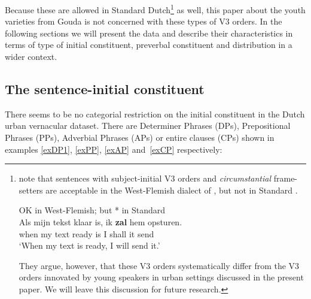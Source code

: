 \documentclass[output=paper]{langsci/langscibook}
\begin{document}
\noindent Because these are allowed in Standard
Dutch\footnote{\citet{GrecoHaegeman2020} note that sentences with
    subject-initial V3 orders and \emph{circumstantial} frame-setters are
    acceptable in the West-Flemish dialect of , but not in Standard .

\begin{exe}                   %
     OK in West-Flemish; but * in Standard \\
    \gll \llap{*}Als mijn tekst klaar is, ik \textbf{zal} hem opsturen.\\
    when my text ready is I shall it send\\
    \trans \enquote*{When my text is ready, I will send it.}
\end{exe}                   %

They argue, however, that these V3 orders systematically differ from the V3
orders innovated by young  speakers in urban settings discussed in the
present paper. We will leave this discussion for future research.} as well,
this paper about the  youth varieties from Gouda is not concerned with
these types of V3 orders. In the following sections we will present the data
and describe their characteristics in terms of type of initial constituent,
preverbal constituent and distribution in a wider context.

\subsection{The sentence-initial constituent}
\label{sec:dataic}

There seems to be no categorial restriction on the initial constituent in the
Dutch urban vernacular dataset. There are Determiner Phrases (DPs),
Prepositional Phrases (PPs), Adverbial Phrases (APs) or entire clauses (CPs)
shown in examples \eqref{exDP1}, \eqref{exPP}, \eqref{exAP} and~\eqref{exCP}
respectively:
\end{document}
